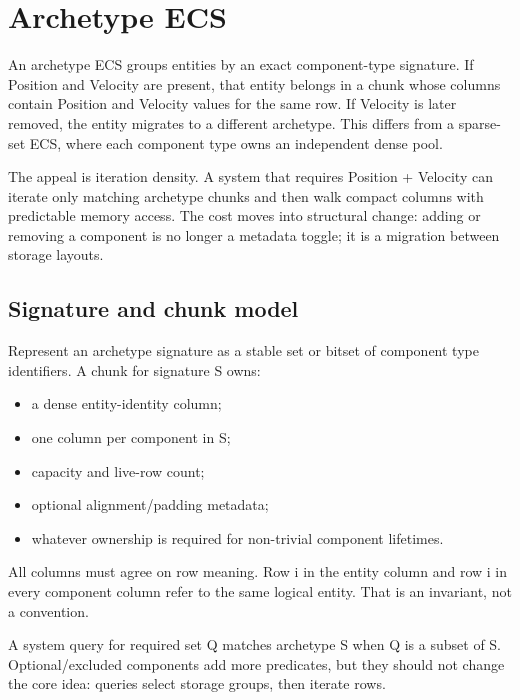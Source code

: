 \hypertarget{appendix-fbfeb0430008}{}
\section{Archetype ECS}\label{appendix-fbfeb0430008-archetype-ecs}

An archetype ECS groups entities by an exact component-type signature. If Position and Velocity are present, that entity belongs in a chunk whose columns contain Position and Velocity values for the same row. If Velocity is later removed, the entity migrates to a different archetype. This differs from a sparse-set ECS, where each component type owns an independent dense pool.

The appeal is iteration density. A system that requires Position + Velocity can iterate only matching archetype chunks and then walk compact columns with predictable memory access. The cost moves into structural change: adding or removing a component is no longer a metadata toggle; it is a migration between storage layouts.

\subsection{Signature and chunk model}\label{appendix-fbfeb0430008-signature-and-chunk-model}

Represent an archetype signature as a stable set or bitset of component type identifiers. A chunk for signature S owns:

\begin{itemize}
\tightlist
\item
  a dense entity-identity column;
\item
  one column per component in S;
\item
  capacity and live-row count;
\item
  optional alignment/padding metadata;
\item
  whatever ownership is required for non-trivial component lifetimes.
\end{itemize}

All columns must agree on row meaning. Row i in the entity column and row i in every component column refer to the same logical entity. That is an invariant, not a convention.

A system query for required set Q matches archetype S when Q is a subset of S. Optional/excluded components add more predicates, but they should not change the core idea: queries select storage groups, then iterate rows.

